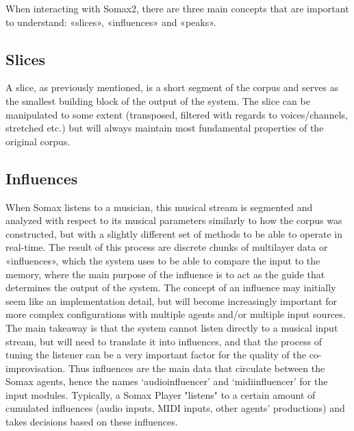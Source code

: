 When interacting with Somax2, there are three main concepts that are important to understand: «slices», «influences» and «peaks».

\subsection{Slices}
A slice, as previously mentioned, is a short segment of the corpus and serves as the smallest building block of the output of the system. The slice can be manipulated to some extent (transposed, filtered with regards to voices/channels, stretched etc.) but will always maintain most fundamental properties of the original corpus. 

\subsection{Influences}
When Somax listens to a musician, this musical stream is segmented and analyzed with respect to its musical parameters similarly to how the corpus was constructed, but with a slightly different set of methods to be able to operate in real-time. The result of this process are discrete chunks of multilayer data or «influences», which the system uses to be able to compare the input to the memory, where the main purpose of the influence is to act as the guide that determines the output of the system. The concept of an influence may initially seem like an implementation detail, but will become increasingly important for more complex configurations with multiple agents and/or multiple input sources. The main takeaway is that the system cannot listen directly to a musical input stream, but will need to translate it into influences, and that the process of tuning the listener can be a very important factor for the quality of the co-improvisation. Thus influences are the main data that circulate between the Somax agents, hence the names `audioinfluencer' and `midiinfluencer' for the input modules. Typically, a Somax Player "listens" to a certain amount of cumulated influences (audio inputs, MIDI inputs, other agents' productions) and takes decisions based on these influences.


